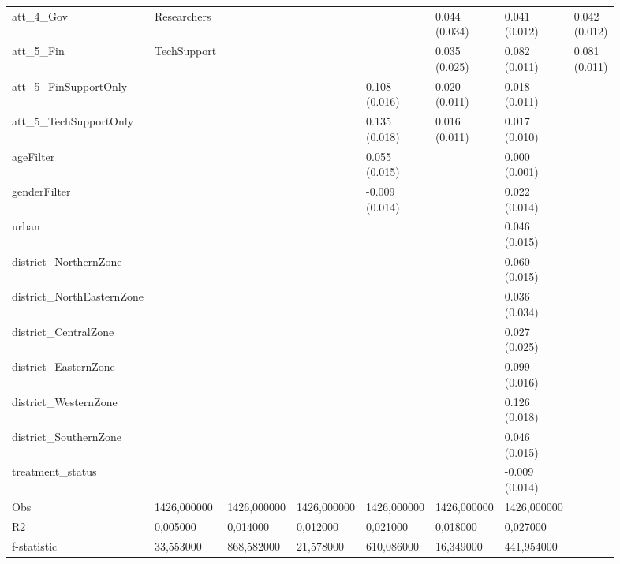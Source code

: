 \begin{tabular}{lllllll}
att_4_Gov&Researchers &   &   &   & \makecell{ 0.044 \\ (0.034) } & \makecell{ 0.041 \\ (0.012) } & \makecell{ 0.042 \\ (0.012) } \\
att_5_Fin&TechSupport &   &   &   & \makecell{ 0.035 \\ (0.025) } & \makecell{ 0.082 \\ (0.011) } & \makecell{ 0.081 \\ (0.011) } \\
att_5_FinSupportOnly &   &   &   & \makecell{ 0.108 \\ (0.016) } & \makecell{ 0.020 \\ (0.011) } & \makecell{ 0.018 \\ (0.011) } \\
att_5_TechSupportOnly &   &   &   & \makecell{ 0.135 \\ (0.018) } & \makecell{ 0.016 \\ (0.011) } & \makecell{ 0.017 \\ (0.010) } \\
ageFilter &   &   &   & \makecell{ 0.055 \\ (0.015) } &   & \makecell{ 0.000 \\ (0.001) } \\
genderFilter &   &   &   & \makecell{ -0.009 \\ (0.014) } &   & \makecell{ 0.022 \\ (0.014) } \\
urban &   &   &   &   &   & \makecell{ 0.046 \\ (0.015) } \\
district_NorthernZone &   &   &   &   &   & \makecell{ 0.060 \\ (0.015) } \\
district_NorthEasternZone &   &   &   &   &   & \makecell{ 0.036 \\ (0.034) } \\
district_CentralZone &   &   &   &   &   & \makecell{ 0.027 \\ (0.025) } \\
district_EasternZone &   &   &   &   &   & \makecell{ 0.099 \\ (0.016) } \\
district_WesternZone &   &   &   &   &   & \makecell{ 0.126 \\ (0.018) } \\
district_SouthernZone &   &   &   &   &   & \makecell{ 0.046 \\ (0.015) } \\
treatment_status &   &   &   &   &   & \makecell{ -0.009 \\ (0.014) } \\
Obs & 1426,000000 & 1426,000000 & 1426,000000 & 1426,000000 & 1426,000000 & 1426,000000 \\
R2 & 0,005000 & 0,014000 & 0,012000 & 0,021000 & 0,018000 & 0,027000 \\
f-statistic & 33,553000 & 868,582000 & 21,578000 & 610,086000 & 16,349000 & 441,954000 \\
\bottomrule
\end{tabular}
